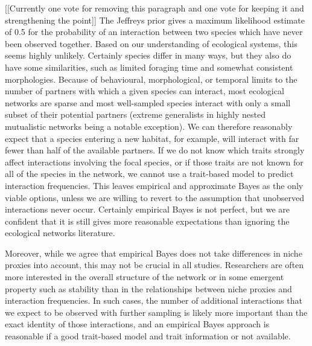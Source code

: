 \documentclass[12pt]{letter}
\begin{document}
		[[Currently one vote for removing this paragraph and one vote for keeping it and strengthening the point]]
		The Jeffreys prior gives a maximum likelihood estimate of 0.5 for the probability of an interaction between two species which have never been observed together. Based on our understanding of ecological systems, this seems highly unlikely. Certainly species differ in many ways, but they also do have some similarities, such as limited foraging time and somewhat consistent morphologies. Because of behavioural, morphological, or temporal limits to the number of partners with which a given species can interact, most ecological networks are sparse and most well-sampled species interact with only a small subset of their potential partners (extreme generalists in highly nested mutualistic networks being a notable exception). We can therefore reasonably expect that a species entering a new habitat, for example, will interact with far fewer than half of the available partners. If we do not know which traits strongly affect interactions involving the focal species, or if those traits are not known for all of the species in the network, we cannot use a trait-based model to predict interaction frequencies. This leaves empirical and approximate Bayes as the only viable options, unless we are willing to revert to the assumption that unobserved interactions never occur. Certainly empirical Bayes is not perfect, but we are confident that it is still gives more reasonable expectations than ignoring the ecological networks literature.


		Moreover, while we agree that empirical Bayes does not take differences in niche proxies into account, this may not be crucial in all studies. Researchers are often more interested in the overall structure of the network or in some emergent property such as stability than in the relationships between niche proxies and interaction frequencies. In such cases, the number of additional interactions that we expect to be observed with further sampling is likely more important than the exact identity of those interactions, and an empirical Bayes approach is reasonable if a good trait-based model and trait information or not available. 
\end{document}
